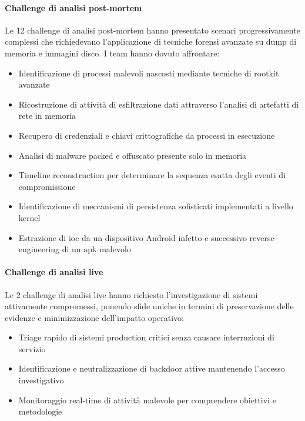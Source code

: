 \paragraph{Challenge di analisi post-mortem}
Le 12 challenge di analisi post-mortem hanno presentato scenari progressivamente complessi che richiedevano l'applicazione di tecniche forensi avanzate su dump di memoria e immagini disco. I team hanno dovuto affrontare:
\begin{itemize}
    \item Identificazione di processi malevoli nascosti mediante tecniche di rootkit avanzate
    \item Ricostruzione di attività di esfiltrazione dati attraverso l'analisi di artefatti di rete in memoria
    \item Recupero di credenziali e chiavi crittografiche da processi in esecuzione
    \item Analisi di malware packed e offuscato presente solo in memoria
    \item Timeline reconstruction per determinare la sequenza esatta degli eventi di compromissione
    \item Identificazione di meccanismi di persistenza sofisticati implementati a livello kernel
    \item Estrazione di ioc da un dispositivo Android infetto e successivo reverse engineering di un apk malevolo
\end{itemize}

\paragraph{Challenge di analisi live}
Le 2 challenge di analisi live hanno richiesto l'investigazione di sistemi attivamente compromessi, ponendo sfide uniche in termini di preservazione delle evidenze e minimizzazione dell'impatto operativo:
\begin{itemize}
    \item Triage rapido di sistemi production critici senza causare interruzioni di servizio
    \item Identificazione e neutralizzazione di backdoor attive mantenendo l'accesso investigativo
    \item Monitoraggio real-time di attività malevole per comprendere obiettivi e metodologie
\end{itemize}

